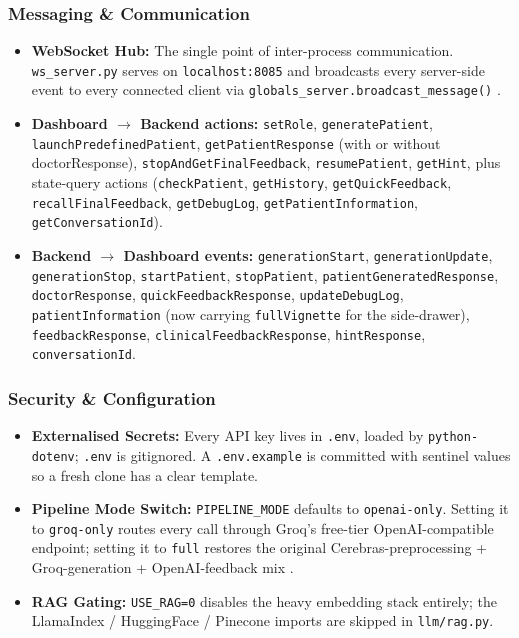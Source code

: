 \documentclass{article}
\begin{document}
\subsubsection{Messaging \& Communication}
\begin{itemize}
    \item \textbf{WebSocket Hub:} The single point of inter-process communication. \texttt{ws\_server.py} serves on \texttt{localhost:8085} and broadcasts every server-side event to every connected client via \texttt{globals\_server.broadcast\_message()} \cite{Rygl2017SemanticVE}.

    \item \textbf{Dashboard $\rightarrow$ Backend actions:}
    \texttt{setRole}, \texttt{generatePatient}, \texttt{launchPredefinedPatient}, \texttt{getPatientResponse} (with or without doctorResponse), \texttt{stopAndGetFinalFeedback}, \texttt{resumePatient}, \texttt{getHint}, plus state-query actions (\texttt{checkPatient}, \texttt{getHistory}, \texttt{getQuickFeedback}, \texttt{recallFinalFeedback}, \texttt{getDebugLog}, \texttt{getPatientInformation}, \texttt{getConversationId}).

    \item \textbf{Backend $\rightarrow$ Dashboard events:}
    \texttt{generationStart}, \texttt{generationUpdate}, \texttt{generationStop}, \texttt{startPatient}, \texttt{stopPatient}, \texttt{patientGeneratedResponse}, \texttt{doctorResponse}, \texttt{quickFeedbackResponse}, \texttt{updateDebugLog}, \texttt{patientInformation} (now carrying \texttt{fullVignette} for the side-drawer), \texttt{feedbackResponse}, \texttt{clinicalFeedbackResponse}, \texttt{hintResponse}, \texttt{conversationId}.
\end{itemize}

\subsubsection{Security \& Configuration}
\begin{itemize}
    \item \textbf{Externalised Secrets:} Every API key lives in \texttt{.env}, loaded by \texttt{python-dotenv}; \texttt{.env} is gitignored. A \texttt{.env.example} is committed with sentinel values so a fresh clone has a clear template.
    \item \textbf{Pipeline Mode Switch:} \texttt{PIPELINE\_MODE} defaults to \texttt{openai-only}. Setting it to \texttt{groq-only} routes every call through Groq's free-tier OpenAI-compatible endpoint; setting it to \texttt{full} restores the original Cerebras-preprocessing + Groq-generation + OpenAI-feedback mix \cite{Kulkarni2023TheEO}.
    \item \textbf{RAG Gating:} \texttt{USE\_RAG=0} disables the heavy embedding stack entirely; the LlamaIndex / HuggingFace / Pinecone imports are skipped in \texttt{llm/rag.py}.
\end{itemize}
\end{document}
